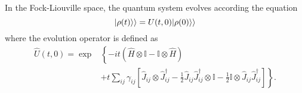 In the Fock-Liouville space, the quantum system evolves according the equation
\begin{equation}
    \lvert\rho(t)\rangle\rangle  = U(t,0) \lvert\rho(0)\rangle\rangle
\end{equation} 
where the evolution operator is defined as \cite{Domino}
\begin{equation}
    \begin{split}
        \hat U(t,0) = \exp&\left\{-it\left(\hat H\otimes\mathbb{I}-\mathbb{I}\otimes\hat H\right)\right.\\
        &+\left. t\sum_{ij}\gamma_{ij}\left[ \hat J_{ij}\otimes\hat J^\dagger_{ij}-\frac{1}{2}\hat J_{ij}\hat J^\dagger_{ij}\otimes\mathbb{I}-\frac{1}{2}\mathbb{I}\otimes\hat J_{ij}\hat J^\dagger_{ij}\right]\right\}.
    \end{split}
\end{equation}

